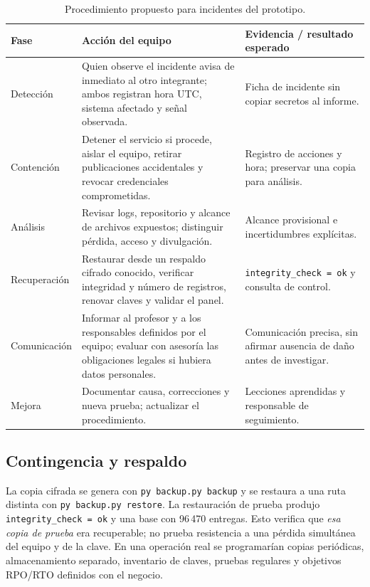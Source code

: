 \documentclass[12pt,a4paper]{article}
\begin{document}
\begin{table}[H]
\centering\footnotesize
\begin{tabularx}{\textwidth}{P{2.5cm}Y P{4.4cm}}
\toprule
Fase & Acción del equipo & Evidencia / resultado esperado\\
\midrule
Detección & Quien observe el incidente avisa de inmediato al otro integrante; ambos registran hora UTC, sistema afectado y señal observada. & Ficha de incidente sin copiar secretos al informe.\\
Contención & Detener el servicio si procede, aislar el equipo, retirar publicaciones accidentales y revocar credenciales comprometidas. & Registro de acciones y hora; preservar una copia para análisis.\\
Análisis & Revisar logs, repositorio y alcance de archivos expuestos; distinguir pérdida, acceso y divulgación. & Alcance provisional e incertidumbres explícitas.\\
Recuperación & Restaurar desde un respaldo cifrado conocido, verificar integridad y número de registros, renovar claves y validar el panel. & \texttt{integrity\_check = ok} y consulta de control.\\
Comunicación & Informar al profesor y a los responsables definidos por el equipo; evaluar con asesoría las obligaciones legales si hubiera datos personales. & Comunicación precisa, sin afirmar ausencia de daño antes de investigar.\\
Mejora & Documentar causa, correcciones y nueva prueba; actualizar el procedimiento. & Lecciones aprendidas y responsable de seguimiento.\\
\bottomrule
\end{tabularx}
\caption{Procedimiento propuesto para incidentes del prototipo.}
\end{table}

\subsection{Contingencia y respaldo}
La copia cifrada se genera con \texttt{py backup.py backup} y se restaura a una ruta distinta con \texttt{py backup.py restore}. La restauración de prueba produjo \texttt{integrity\_check = ok} y una base con 96\,470 entregas. Esto verifica que \emph{esa copia de prueba} era recuperable; no prueba resistencia a una pérdida simultánea del equipo y de la clave. En una operación real se programarían copias periódicas, almacenamiento separado, inventario de claves, pruebas regulares y objetivos RPO/RTO definidos con el negocio.
\end{document}
